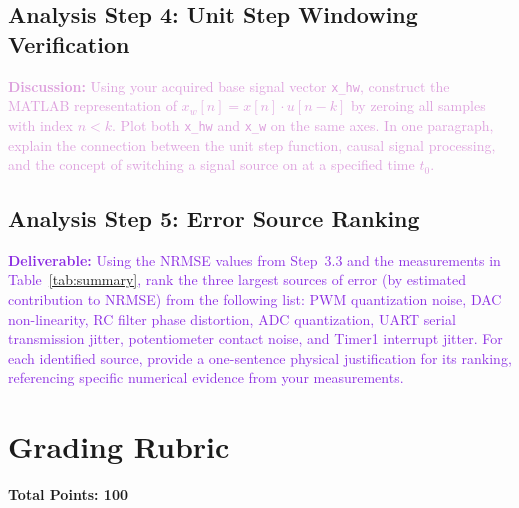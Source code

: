 \documentclass[11pt,letterpaper]{article}
\providecommand{\disECE}[1]{\textcolor{Plum}{\textbf{Discussion:} #1}}
\providecommand{\delECE}[1]{\textcolor{BlueViolet}{\textbf{Deliverable:} #1}}
\begin{document}
\subsection{Analysis Step 4: Unit Step Windowing Verification}
\disECE{Using your acquired base signal vector \texttt{x\_hw}, construct the MATLAB representation of $x_w[n] = x[n] \cdot u[n - k]$ by zeroing all samples with index $n < k$. Plot both \texttt{x\_hw} and \texttt{x\_w} on the same axes. In one paragraph, explain the connection between the unit step function, causal signal processing, and the concept of switching a signal source on at a specified time $t_0$.}

\subsection{Analysis Step 5: Error Source Ranking}
\delECE{Using the NRMSE values from Step~3.3 and the measurements in Table~\ref{tab:summary}, rank the three largest sources of error (by estimated contribution to NRMSE) from the following list: PWM quantization noise, DAC non-linearity, RC filter phase distortion, ADC quantization, UART serial transmission jitter, potentiometer contact noise, and Timer1 interrupt jitter. For each identified source, provide a one-sentence physical justification for its ranking, referencing specific numerical evidence from your measurements.}

\clearpage

\section{Grading Rubric}
\textbf{Total Points: 100}
\end{document}
